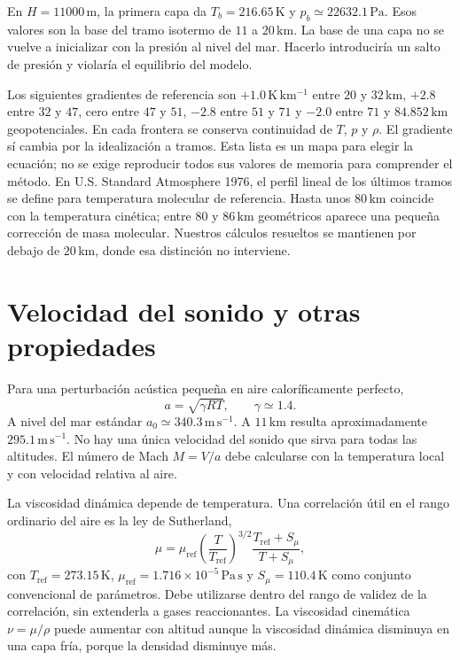 En $H=11000\,\mathrm{m}$, la primera capa da $T_b=216.65\,\mathrm{K}$ y $p_b\simeq22632.1\,\mathrm{Pa}$. Esos valores son la base del tramo isotermo de $11$ a $20\,\mathrm{km}$. La base de una capa no se vuelve a inicializar con la presión al nivel del mar. Hacerlo introduciría un salto de presión y violaría el equilibrio del modelo.

Los siguientes gradientes de referencia son $+1.0\,\mathrm{K\,km^{-1}}$ entre $20$ y $32\,\mathrm{km}$, $+2.8$ entre $32$ y $47$, cero entre $47$ y $51$, $-2.8$ entre $51$ y $71$ y $-2.0$ entre $71$ y $84.852\,\mathrm{km}$ geopotenciales. En cada frontera se conserva continuidad de $T$, $p$ y $\rho$. El gradiente sí cambia por la idealización a tramos. Esta lista es un mapa para elegir la ecuación; no se exige reproducir todos sus valores de memoria para comprender el método. En U.S. Standard Atmosphere 1976, el perfil lineal de los últimos tramos se define para temperatura molecular de referencia. Hasta unos $80\,\mathrm{km}$ coincide con la temperatura cinética; entre $80$ y $86\,\mathrm{km}$ geométricos aparece una pequeña corrección de masa molecular. Nuestros cálculos resueltos se mantienen por debajo de $20\,\mathrm{km}$, donde esa distinción no interviene.


\section{Velocidad del sonido y otras propiedades}
Para una perturbación acústica pequeña en aire caloríficamente perfecto,
\begin{equation}
 a=\sqrt{\gamma RT},\qquad \gamma\simeq1.4.
\end{equation}
A nivel del mar estándar $a_0\simeq340.3\,\mathrm{m\,s^{-1}}$. A $11\,\mathrm{km}$ resulta aproximadamente $295.1\,\mathrm{m\,s^{-1}}$. No hay una única velocidad del sonido que sirva para todas las altitudes. El número de Mach $M=V/a$ debe calcularse con la temperatura local y con velocidad relativa al aire.

La viscosidad dinámica depende de temperatura. Una correlación útil en el rango ordinario del aire es la ley de Sutherland,
\begin{equation}
 \mu=\mu_{\mathrm{ref}}\left(\frac{T}{T_{\mathrm{ref}}}\right)^{3/2}
 \frac{T_{\mathrm{ref}}+S_\mu}{T+S_\mu},
\end{equation}
con $T_{\mathrm{ref}}=273.15\,\mathrm{K}$, $\mu_{\mathrm{ref}}=1.716\times10^{-5}\,\mathrm{Pa\,s}$ y $S_\mu=110.4\,\mathrm{K}$ como conjunto convencional de parámetros. Debe utilizarse dentro del rango de validez de la correlación, sin extenderla a gases reaccionantes. La viscosidad cinemática $\nu=\mu/\rho$ puede aumentar con altitud aunque la viscosidad dinámica disminuya en una capa fría, porque la densidad disminuye más.

